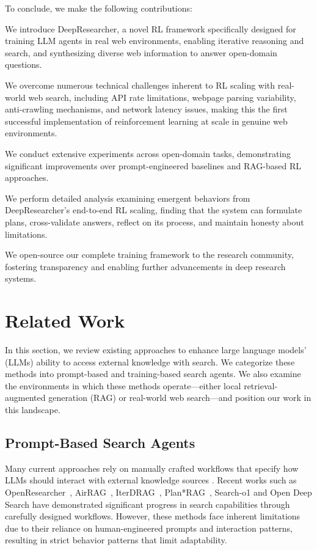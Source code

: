 \documentclass{article}
\newenvironment{itemize*}%
 {\leftmargini=10pt\begin{itemize}%
  \setlength{\itemsep}{0pt}%
  \setlength{\parskip}{0pt}%
  }%
 {\end{itemize}}
\newcommand{\scrl}{DeepResearcher\xspace}
\begin{document}
To conclude, we make the following contributions:
\begin{itemize*}
\item We introduce \scrl, a novel RL framework specifically designed for training LLM agents in real web environments, enabling iterative reasoning and search, and synthesizing diverse web information to answer open-domain questions.
\item We overcome numerous technical challenges inherent to RL scaling with real-world web search, including API rate limitations, webpage parsing variability, anti-crawling mechanisms, and network latency issues, making this the first successful implementation of reinforcement learning at scale in genuine web environments.
\item We conduct extensive experiments across open-domain tasks, demonstrating significant improvements over prompt-engineered baselines and RAG-based RL approaches.
\item We perform detailed analysis examining emergent behaviors from \scrl's end-to-end RL scaling, finding that the system can formulate plans, cross-validate answers, reflect on its process, and maintain honesty about limitations.
\item We open-source our complete training framework to the research community, fostering transparency and enabling further advancements in deep research systems.
\end{itemize*}

\section{Related Work}

In this section, we review existing approaches to enhance large language models' (LLMs) ability to access external knowledge with search. We categorize these methods into prompt-based and training-based search agents. We also examine the environments in which these methods operate—either local retrieval-augmented generation (RAG) or real-world web search—and position our work in this landscape.

\subsection{Prompt-Based Search Agents}
Many current approaches rely on manually crafted workflows that specify how LLMs should interact with external knowledge sources \cite{wang2024searching}. Recent works such as OpenResearcher~\cite{zheng-etal-2024-openresearcher}, AirRAG~\cite{feng2025airrag}, IterDRAG~\cite{yue2024inference}, Plan*RAG~\cite{verma2025planragefficienttesttimeplanning}, Search-o1 \cite{li2025search} and Open Deep Search \cite{alzubi2025open} have demonstrated significant progress in search capabilities through carefully designed workflows. However, these methods face inherent limitations due to their reliance on human-engineered prompts and interaction patterns, resulting in strict behavior patterns that limit adaptability.
\end{document}
